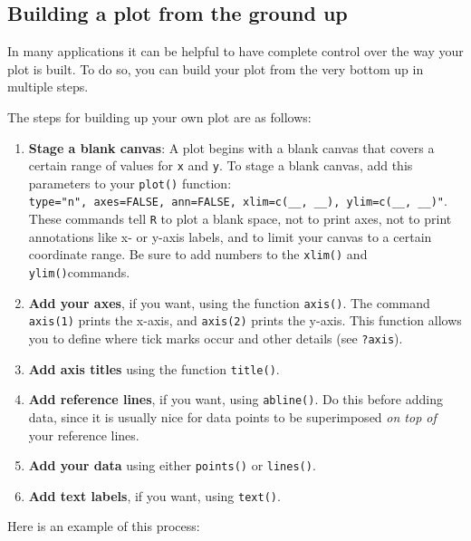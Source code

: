 \documentclass[
]{book}
\begin{document}
\hypertarget{building-a-plot-from-the-ground-up}{%
\subsection*{Building a plot from the ground up}\label{building-a-plot-from-the-ground-up}}

In many applications it can be helpful to have complete control over the way your plot is built. To do so, you can build your plot from the very bottom up in multiple steps.

The steps for building up your own plot are as follows:

\begin{enumerate}
\def\labelenumi{\arabic{enumi}.}
\item
  \textbf{Stage a blank canvas}: A plot begins with a blank canvas that covers a certain range of values for \texttt{x} and \texttt{y}. To stage a blank canvas, add this parameters to your \texttt{plot()} function: \texttt{type="n",\ axes=FALSE,\ ann=FALSE,\ xlim=c(\_\_,\ \_\_),\ ylim=c(\_\_,\ \_\_)"}. These commands tell \texttt{R} to plot a blank space, not to print axes, not to print annotations like x- or y-axis labels, and to limit your canvas to a certain coordinate range. Be sure to add numbers to the \texttt{xlim()} and \texttt{ylim()}commands.
\item
  \textbf{Add your axes}, if you want, using the function \texttt{axis()}. The command \texttt{axis(1)} prints the x-axis, and \texttt{axis(2)} prints the y-axis. This function allows you to define where tick marks occur and other details (see \texttt{?axis}).
\item
  \textbf{Add axis titles} using the function \texttt{title()}.
\item
  \textbf{Add reference lines}, if you want, using \texttt{abline()}. Do this before adding data, since it is usually nice for data points to be superimposed \emph{on top of} your reference lines.
\item
  \textbf{Add your data} using either \texttt{points()} or \texttt{lines()}.
\item
  \textbf{Add text labels}, if you want, using \texttt{text()}.
\end{enumerate}

Here is an example of this process:
\end{document}
